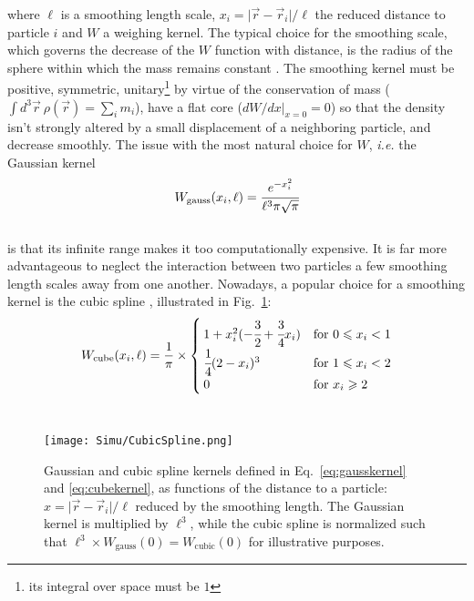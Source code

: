 where $\ell$ is a smoothing length scale, $x_i = \vert \vec{r} - \vec{r}_i \vert / \ell$ the reduced distance to particle $i$ and $W$ a weighing kernel. The typical choice for the smoothing scale, which governs the decrease of the $W$ function with distance, is the radius of the sphere within which the mass remains constant \citep{Springel2002}. The smoothing kernel must be positive, symmetric, unitary\footnote{its integral over space must be $1$} by virtue of the conservation of mass ($\int d^3\vec{r}~\rho(\vec{r}) = \sum_i m_i$), have a flat core ($\left. dW/dx \right\vert_{x=0} = 0$) so that the density isn't strongly altered by a small displacement of a neighboring particle, and decrease smoothly. The issue with the most natural choice for $W$, \textit{i.e.} the Gaussian kernel \\
\begin{equation}
\label{eq:gausskernel}
\displaystyle W_{\mathrm{gauss}}(x_i, \ell) = \cfrac{e^{- x_i^2}}{\ell^3 \pi \sqrt{\pi}}
\end{equation} \\ is that its infinite range makes it too computationally expensive. It is far more advantageous to neglect the interaction between two particles a few smoothing length scales away from one another. Nowadays, a popular choice for a smoothing kernel is the cubic spline \citep{Monaghan1985}, illustrated in Fig.~\ref{fig:spline}: \\
\begin{equation}
\label{eq:cubekernel}
W_{\mathrm{cube}}(x_i, \ell) = \frac{1}{\pi} \times
\begin{cases}
1 + x_i^2 (-\cfrac{3}{2} + \cfrac{3}{4} x_i) & \text{for}~0 \leqslant x_i < 1 \\
\cfrac{1}{4} (2-x_i)^3 & \text{for}~1 \leqslant  x_i < 2\\
0 & \text{for}~x_i \geqslant 2
\end{cases}
\end{equation} \\

\begin{figure}
\centering
\texttt{[image: Simu/CubicSpline.png]}
\caption{Gaussian and cubic spline kernels defined in Eq.~\ref{eq:gausskernel} and \ref{eq:cubekernel}, as functions of the distance to a particle: $x = \vert \vec{r} - \vec{r}_i \vert / \ell$ reduced by the smoothing length. The Gaussian kernel is multiplied by $\ell^3$, while the cubic spline is normalized such that $\ell^3 \times W_{\mathrm{gauss}} (0) = W_{\mathrm{cubic}} (0)$ for illustrative purposes.}
\label{fig:spline}
\end{figure}

